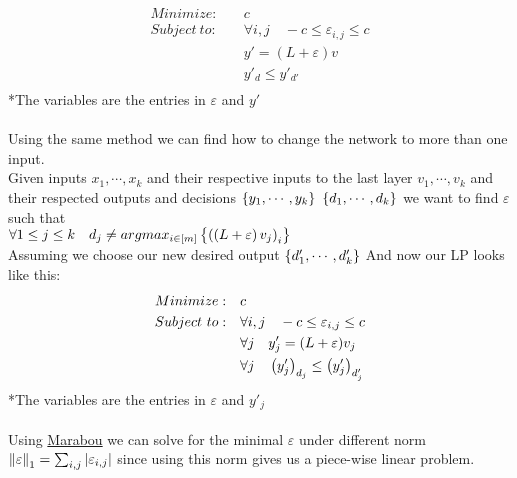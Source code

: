 \documentclass{article}
\begin{document}
\begin{align*}
    Minimize:\quad & c \\
    Subject\ to:\quad & \forall i,j\quad -c \leq\varepsilon_{i,j}\leq c\\
    & y'=(L+\varepsilon)v \\
    & y'_d \leq y'_{d'}\\
\end{align*}
\hspace*{5cm} *The variables are the entries in $\varepsilon$ and $y'$
\\\\
Using the same method we can find how to change the network to more than one input.\\
Given inputs $x_1,\cdots,x_k$ and their respective inputs to the last layer $v_1,\cdots,v_k$ and their respected outputs and decisions $\bracketsC{y_1,\cdots,y_k}\ \bracketsC{d_1,\cdots,d_k}$ we want to find $\varepsilon$ such that\\
$\forall 1\leq j\leq k\quad d_j \neq argmax_{i\in\left[m\right]}\left\lbrace \left(\left(L+\varepsilon\right)v_j\right)_i\right\rbrace$\\
Assuming we choose our new desired output $\left\lbrace d'_1,\cdots,d'_k\right\rbrace$
And now our LP looks like this:\\
\begin{align*}
    Minimize:\quad & c \\
    Subject\ to:\quad & \forall i,j\quad -c \leq\varepsilon_{i,j}\leq c\\
    & \forall j\quad y'_j=(L+\varepsilon)v_j \\
    & \forall j\quad \left(y'_j\right)_{d_j} \leq \left(y'_j\right)_{d'_j}\\
\end{align*}
\hspace*{5cm} *The variables are the entries in $\varepsilon$ and $y'_j$
\\\\
Using \href{http://aisafety.stanford.edu/marabou/MarabouCAV2019.pdf}{Marabou} we can solve for the minimal $\varepsilon$ under different norm $\left\lVert\varepsilon\right\rVert_1=\sum_{i,j}\left\lvert\varepsilon_{i,j}\right\rvert$ since using this norm gives us a piece-wise linear problem. 
\end{document}
